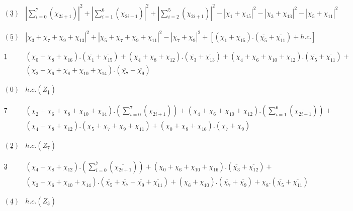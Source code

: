\documentclass[a4paper,11pt]{article}
\providecommand{\ch}[1]{\chi_{#1}}
\providecommand{\och}[1]{\overline{\chi_{#1}}}
\providecommand{\ud}[1]{\underline{#1}}
\providecommand{\xaa}[2]{|\chi_{#1} + \chi_{#2}|^2}
\providecommand{\xaaaa}[4]{|\chi_{#1} + \chi_{#2}+ \chi_{#3}+ \chi_{#4}|^2}
\begin{document}
\begin{table}
$${\begin{array}{|c||l|}
{}  &  {}  \\
(\ud3)  & |\sum_{i=0}^{7}(\ch{2i+1})|^{2} + |\sum_{i=1}^{6}(\ch{2i+1})|^{2} +
|\sum_{i=2}^{5}(\ch{2i+1})|^{2} - \xaa{1}{15} - \xaa{3}{13} - \xaa{5}{11} \\
{}  &  {}  \\
\hline
{}  &  {}  \\
(\ud5)   & \xaaaa{3}{7}{9}{13} + \xaaaa{5}{7}{9}{11}- \xaa{7}{9} +
[(\ch{1}+  \ch{15}).(\och{5} + \och{11}) + h.c.] \\
{}  &  {}  \\
\hline
\hline
{}  &  {} \\
\ud1  & (\ch{0} + \ch{8} + \ch{16}).(\och{1} + \och{15}) + (\ch{4} +
\ch{8} + \ch{12}).(\och{3} + \och{13}) + (\ch{4} + \ch{6} + \ch{10} +
\ch{12}).(\och{5} + \och{11}) + \\
{} &  (\ch{2} + \ch{6} + \ch{8} +\ch{10} + \ch{14}).(\och{7} + \och{9}) \\
{}  &  {}  \\
\hline
{}  &  {}  \\
(\ud0)  &  h.c.(Z_{\ud1}) \\
{}  &  {}  \\
\hline
{}  &  {}  \\
\ud7  &  (\ch{2} + \ch{6} + \ch{8} + \ch{10} +
\ch{14}).(\sum_{i=0}^{7}(\och{2i+1}))+ (\ch{4} + \ch{6} + \ch{10} +
\ch{12}).(\sum_{i=1}^{6}(\och{2i+1})) + \\
{}  & (\ch{4} + \ch{8} + \ch{12}).(\och{5} + \och{7} + \och{9} + \och{11})
+ (\ch{0} + \ch{8} + \ch{16}).(\och{7} + \och{9}) \\
{}  &  {}  \\
\hline
{}  &  {}  \\
(\ud2)  &  h.c.(Z_{\ud7}) \\
{}  &  {}  \\
\hline
{}  &  {}  \\
\ud3  & (\ch{4} + \ch{8} + \ch{12}).(\sum_{i=0}^{7}(\och{2i+1})) +
(\ch{0} + \ch{6} + \ch{10} + \ch{16}).(\och{3} + \och{12}) + \\
{}  & (\ch{2} + \ch{6} + \ch{10} + \ch{14}).(\och{5} + \och{7} +
\och{9} + \och{11}) + (\ch{6} + \ch{10}).(\och{7} + \och{9}) +
\ch{8}.(\och{5} + \och{11}) \\
{}  &  {}  \\
\hline
{}  &  {}  \\
(\ud4)  &  h.c.(Z_{\ud3}) \\
{}  &  {}  \\
\hline
{}  &  {}  \\

\end{array}}$$
\end{table}
\end{document}
